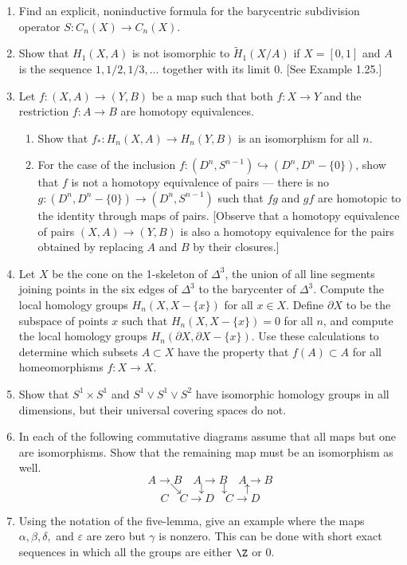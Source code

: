 \begin{enumerate}
\item Find an explicit, noninductive formula for the barycentric subdivision operator
$S: C_n(X) \to C_n(X)$.

\item Show that $H_1(X, A)$ is not isomorphic to $\tilde H_1(X/A)$ if $X = [0,1]$ and $A$ is the
sequence $1, 1/2, 1/3, \ldots$ together with its limit $0$. [See Example 1.25.]

\item Let $f:(X,A) \to (Y,B)$ be a map such that both $f: X \to Y$ and the restriction
$f: A \to B$ are homotopy equivalences.
\begin{enumerate}
\item[(a)] Show that $f_*: H_n(X,A) \to H_n(Y,B)$ is an isomorphism for all $n$.
\item[(b)] For the case of the inclusion $f:(D^n, S^{n-1}) \hookrightarrow (D^n, D^n - \{0\})$, show that $f$ is not
a homotopy equivalence of pairs --- there is no $g:(D^n, D^n - \{0\}) \to (D^n, S^{n-1})$ such
that $fg$ and $gf$ are homotopic to the identity through maps of pairs. [Observe that
a homotopy equivalence of pairs $(X,A) \to (Y,B)$ is also a homotopy equivalence for
the pairs obtained by replacing $A$ and $B$ by their closures.]
\end{enumerate}

\item Let $X$ be the cone on the 1-skeleton of $\Delta^3$, the union of all line segments joining
points in the six edges of $\Delta^3$ to the barycenter of $\Delta^3$. Compute the local homology
groups $H_n(X, X - \{x\})$ for all $x \in X$. Define $\partial X$ to be the subspace of points $x$
such that $H_n(X, X - \{x\}) = 0$ for all $n$, and compute the local homology groups
$H_n(\partial X, \partial X - \{x\})$. Use these calculations to determine which subsets $A \subset X$ have the
property that $f(A) \subset A$ for all homeomorphisms $f: X \to X$.

\item Show that $S^1 \times S^1$ and $S^1 \vee S^1 \vee S^2$ have isomorphic homology groups in all
dimensions, but their universal covering spaces do not.

\item In each of the following commutative diagrams assume that all maps but one are
isomorphisms. Show that the remaining map must be an isomorphism as well.
\[
A \to B \quad A \to B \quad A \to B
\]
\[
\searrow \quad \downarrow \quad \downarrow \quad \uparrow
\]
\[
C \quad C \to D \quad C \to D
\]

\item Using the notation of the five-lemma, give an example where the maps $\alpha, \beta, \delta,$
and $\varepsilon$ are zero but $\gamma$ is nonzero. This can be done with short exact sequences in
which all the groups are either $\Z$ or $0$.

\end{enumerate}

